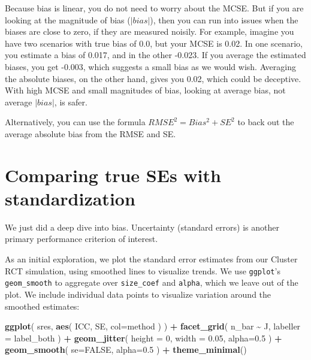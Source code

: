 \documentclass[
]{book}
\newenvironment{Shaded}{\begin{snugshade}}{\end{snugshade}}
\newcommand{\AttributeTok}[1]{\textcolor[rgb]{0.13,0.29,0.53}{#1}}
\newcommand{\ConstantTok}[1]{\textcolor[rgb]{0.56,0.35,0.01}{#1}}
\newcommand{\DecValTok}[1]{\textcolor[rgb]{0.00,0.00,0.81}{#1}}
\newcommand{\FloatTok}[1]{\textcolor[rgb]{0.00,0.00,0.81}{#1}}
\newcommand{\FunctionTok}[1]{\textcolor[rgb]{0.13,0.29,0.53}{\textbf{#1}}}
\newcommand{\NormalTok}[1]{#1}
\newcommand{\SpecialCharTok}[1]{\textcolor[rgb]{0.81,0.36,0.00}{\textbf{#1}}}
\begin{document}
Because bias is linear, you do not need to worry about the MCSE.
But if you are looking at the magnitude of bias (\(|bias|\)), then you can run into issues when the biases are close to zero, if they are measured noisily.
For example, imagine you have two scenarios with true bias of 0.0, but your MCSE is 0.02.
In one scenario, you estimate a bias of 0.017, and in the other -0.023.
If you average the estimated biases, you get -0.003, which suggests a small bias as we would wish.
Averaging the absolute biases, on the other hand, gives you 0.02, which could be deceptive.
With high MCSE and small magnitudes of bias, looking at average bias, not average \(|bias|\), is safer.

Alternatively, you can use the formula \(RMSE^2 = Bias^2 + SE^2\) to back out the average absolute bias from the RMSE and SE.

\section{Comparing true SEs with standardization}\label{comparing-true-ses-with-standardization}

We just did a deep dive into bias.
Uncertainty (standard errors) is another primary performance criterion of interest.

As an initial exploration, we plot the standard error estimates from our Cluster RCT simulation, using smoothed lines to visualize trends. We use \texttt{ggplot}'s \texttt{geom\_smooth} to aggregate over \texttt{size\_coef} and \texttt{alpha}, which we leave out of the plot.
We include individual data points to visualize variation around the smoothed estimates:

\begin{Shaded}
\begin{Highlighting}[]
\FunctionTok{ggplot}\NormalTok{( sres, }\FunctionTok{aes}\NormalTok{( ICC, SE, }\AttributeTok{col=}\NormalTok{method ) ) }\SpecialCharTok{+}
  \FunctionTok{facet\_grid}\NormalTok{( n\_bar }\SpecialCharTok{\textasciitilde{}}\NormalTok{  J, }\AttributeTok{labeller =}\NormalTok{ label\_both ) }\SpecialCharTok{+}
  \FunctionTok{geom\_jitter}\NormalTok{( }\AttributeTok{height =} \DecValTok{0}\NormalTok{, }\AttributeTok{width =} \FloatTok{0.05}\NormalTok{, }\AttributeTok{alpha=}\FloatTok{0.5}\NormalTok{ ) }\SpecialCharTok{+}
  \FunctionTok{geom\_smooth}\NormalTok{( }\AttributeTok{se=}\ConstantTok{FALSE}\NormalTok{, }\AttributeTok{alpha=}\FloatTok{0.5}\NormalTok{ ) }\SpecialCharTok{+}
  \FunctionTok{theme\_minimal}\NormalTok{()}
\end{Highlighting}
\end{Shaded}
\end{document}
